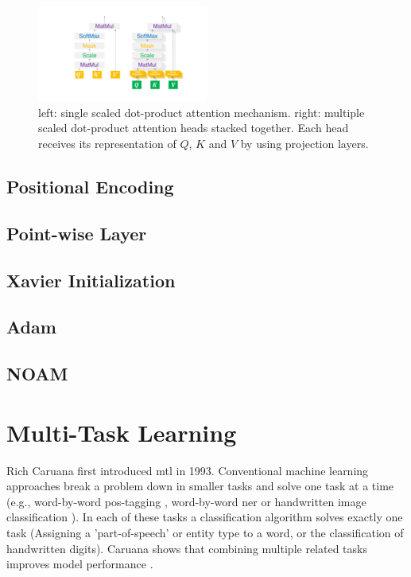 \begin{figure}[htp]
	\centering
	\includegraphics[width=0.5\textwidth]{figures/03_theory/03_transformer_ScaledDot}
	\caption{left: single scaled dot-product attention mechanism. right: multiple scaled dot-product attention heads stacked together. Each head receives its representation of $Q$, $K$ and $V$ by using projection layers.}
	\label{fig:03_transformer_scaledDotProduct}
\end{figure}

\subsection{Positional Encoding}
\subsection{Point-wise Layer}

\subsection{Xavier Initialization}

\subsection{Adam}

\subsection{NOAM}

\section{Multi-Task Learning}

Rich Caruana first introduced \acrfull{mtl} in 1993. Conventional machine learning approaches break a problem down in smaller tasks and solve one task at a time (e.g., word-by-word \gls{pos}-tagging \cite{Toutanova2007}, word-by-word \gls{ner} \cite{Sang2003} or handwritten image classification \cite{LeCun;1990}). In each of these tasks a classification algorithm solves exactly one task (Assigning a 'part-of-speech' or entity type to a word, or the classification of handwritten digits). Caruana shows that combining multiple related tasks improves model performance \cite{Caruana1993}\cite{Caruana1997a}. 


